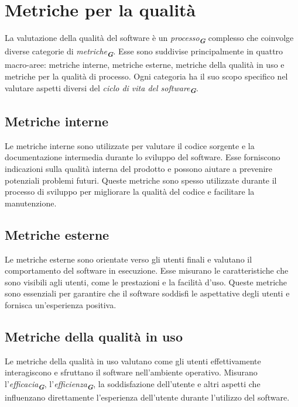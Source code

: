 


\section{Metriche per la qualità}
\label{sec:metriche_qualita}

La valutazione della qualità del software è un \emph{processo}\textsubscript{\textit{\textbf{G}}} complesso che coinvolge diverse
categorie di \emph{metriche}\textsubscript{\textit{\textbf{G}}}. Esse sono suddivise principalmente in quattro macro-aree: metriche
interne, metriche esterne, metriche della qualità in uso e metriche per la qualità di processo.
Ogni categoria ha il suo scopo specifico nel valutare aspetti diversi del \emph{ciclo di vita del
software}\textsubscript{\textit{\textbf{G}}}.


\subsection{Metriche interne}
Le metriche interne sono utilizzate per valutare il codice sorgente e la documentazione
intermedia durante lo sviluppo del software. Esse forniscono indicazioni sulla qualità interna
del prodotto e possono aiutare a prevenire potenziali problemi futuri. Queste metriche
sono spesso utilizzate durante il processo di sviluppo per migliorare la qualità del codice e
facilitare la manutenzione.


\subsection{Metriche esterne}
Le metriche esterne sono orientate verso gli utenti finali e valutano il comportamento del
software in esecuzione. Esse misurano le caratteristiche che sono visibili agli utenti, come le
prestazioni e la facilità d’uso. Queste metriche sono essenziali per garantire che il software
soddisfi le aspettative degli utenti e fornisca un’esperienza positiva.


\subsection{Metriche della qualità in uso}
Le metriche della qualità in uso valutano come gli utenti effettivamente interagiscono e
sfruttano il software nell’ambiente operativo. Misurano l’\emph{efficacia}\textsubscript{\textit{\textbf{G}}}, 
l’\emph{efficienza}\textsubscript{\textit{\textbf{G}}}, la soddisfazione dell’utente e altri aspetti che 
influenzano direttamente l’esperienza dell’utente durante l’utilizzo del software.


